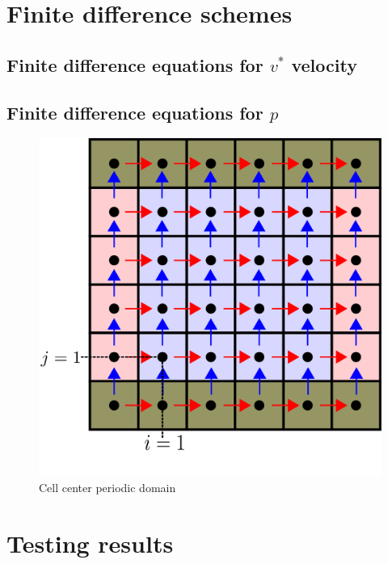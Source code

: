 \documentclass[12pt]{article}
\begin{document}
\section{Finite difference schemes}
    
    \subsection{Finite difference equations for $v^{\ast}$ velocity}
    \subsection{Finite difference equations for $p$}
    \begin{figure}[H]
        \includegraphics[height=0.5\textheight]{../../../media/periodic-BCs}
        \caption{Cell center periodic domain}
        \label{fig:periodic-domain}
    \end{figure}                                                            

\section{Testing results}

\end{document}
